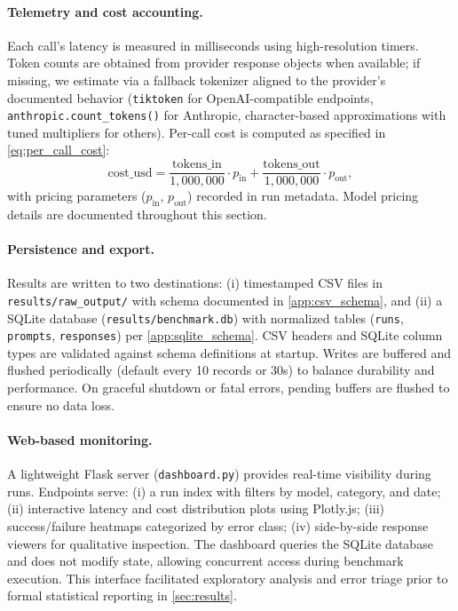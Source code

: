 \paragraph{Telemetry and cost accounting.}\label{tab:model_pricing} Each call's latency is measured in milliseconds using high-resolution timers. Token counts are obtained from provider response objects when available; if missing, we estimate via a fallback tokenizer aligned to the provider's documented behavior (\texttt{tiktoken} for OpenAI-compatible endpoints, \texttt{anthropic.count\_tokens()} for Anthropic, character-based approximations with tuned multipliers for others). Per-call cost is computed as specified in \cref{eq:per_call_cost}:
\begin{equation*}
\text{cost\_usd} = \frac{\text{tokens\_in}}{1{,}000{,}000} \cdot p_{\text{in}} + \frac{\text{tokens\_out}}{1{,}000{,}000} \cdot p_{\text{out}},
\end{equation*}
with pricing parameters ($p_{\text{in}}$, $p_{\text{out}}$) recorded in run metadata. Model pricing details are documented throughout this section.

\paragraph{Persistence and export.} Results are written to two destinations: (i) timestamped CSV files in \texttt{results/raw\_output/} with schema documented in \cref{app:csv_schema}, and (ii) a SQLite database (\texttt{results/benchmark.db}) with normalized tables (\texttt{runs}, \texttt{prompts}, \texttt{responses}) per \cref{app:sqlite_schema}. CSV headers and SQLite column types are validated against schema definitions at startup. Writes are buffered and flushed periodically (default every 10 records or 30s) to balance durability and performance. On graceful shutdown or fatal errors, pending buffers are flushed to ensure no data loss.

\paragraph{Web-based monitoring.} A lightweight Flask server (\texttt{dashboard.py}) provides real-time visibility during runs. Endpoints serve: (i) a run index with filters by model, category, and date; (ii) interactive latency and cost distribution plots using Plotly.js; (iii) success/failure heatmaps categorized by error class; (iv) side-by-side response viewers for qualitative inspection. The dashboard queries the SQLite database and does not modify state, allowing concurrent access during benchmark execution. This interface facilitated exploratory analysis and error triage prior to formal statistical reporting in \cref{sec:results}.

